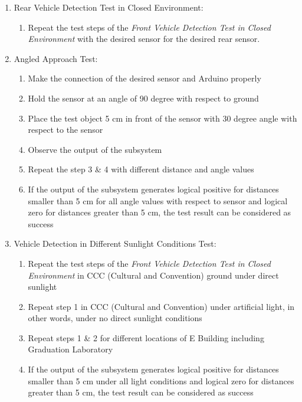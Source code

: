 \documentclass[a4paper,12pt]{article}
\begin{document}
\begin{enumerate}
\begin{enumerate}
\begin{enumerate}
		\item Rear Vehicle Detection Test in Closed Environment:		
			\begin{enumerate}
				\item Repeat the test steps of the \textit{Front Vehicle Detection Test in Closed Environment} with the desired sensor for the desired rear sensor.   
			\end{enumerate}
		
		\item {Angled Approach Test:}
			\begin{enumerate}
				\item Make the connection of the desired sensor and Arduino properly  
				\item Hold the sensor at an angle of 90 degree with respect to ground  
				\item Place the test object 5 cm in front of the sensor with 30 degree angle with respect to the sensor  
				\item Observe the output of the subsystem  
				\item Repeat the step 3 \& 4 with different distance and angle values  
				\item If the output of the subsystem generates logical positive for distances smaller than 5 cm for all angle values with respect to sensor and logical zero for distances greater than 5 cm, the test result can be considered as success  
			\end{enumerate}
		
		\item Vehicle Detection in Different Sunlight Conditions Test:
			\begin{enumerate}
				\item Repeat the test steps of the \textit{Front Vehicle Detection Test in Closed Environment} in CCC (Cultural and Convention) ground under direct sunlight  
				\item Repeat step 1 in CCC (Cultural and Convention) under artificial light, in other words, under no direct sunlight conditions  
				\item Repeat steps 1 \& 2 for different locations of E Building including Graduation Laboratory  
				\item If the output of the subsystem generates logical positive for distances smaller than 5 cm under all light conditions and logical zero for distances greater than 5 cm, the test result can be considered as success  
			\end{enumerate}
			

\end{enumerate}
\end{enumerate}
\end{enumerate}
\end{document}
